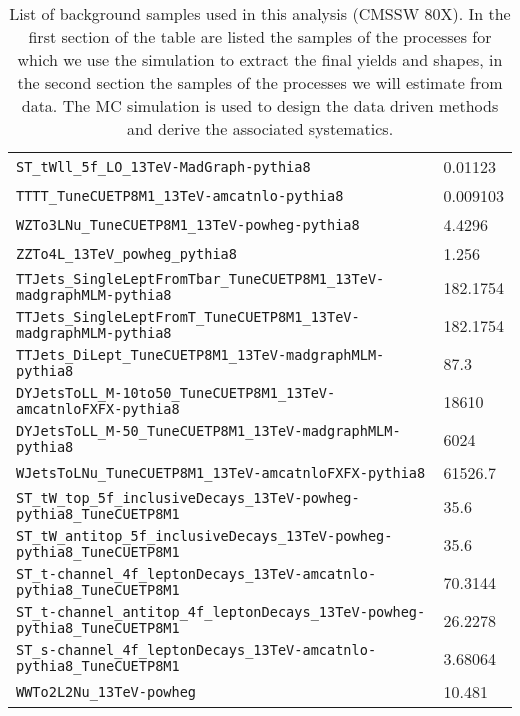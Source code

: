 \begin{table}
\begin{tabular}{ll}
\verb|ST_tWll_5f_LO_13TeV-MadGraph-pythia8|                                   & 0.01123 \\
\verb|TTTT_TuneCUETP8M1_13TeV-amcatnlo-pythia8|                               & 0.009103 \\
\verb|WZTo3LNu_TuneCUETP8M1_13TeV-powheg-pythia8|                             & 4.4296 \\
\verb|ZZTo4L_13TeV_powheg_pythia8|                                            & 1.256 \\ \hline
\verb|TTJets_SingleLeptFromTbar_TuneCUETP8M1_13TeV-madgraphMLM-pythia8|       & 182.1754 \\
\verb|TTJets_SingleLeptFromT_TuneCUETP8M1_13TeV-madgraphMLM-pythia8|          & 182.1754 \\
\verb|TTJets_DiLept_TuneCUETP8M1_13TeV-madgraphMLM-pythia8|                   & 87.3 \\
\verb|DYJetsToLL_M-10to50_TuneCUETP8M1_13TeV-amcatnloFXFX-pythia8|            & 18610 \\
\verb|DYJetsToLL_M-50_TuneCUETP8M1_13TeV-madgraphMLM-pythia8|                 & 6024 \\
\verb|WJetsToLNu_TuneCUETP8M1_13TeV-amcatnloFXFX-pythia8|                     & 61526.7 \\
\verb|ST_tW_top_5f_inclusiveDecays_13TeV-powheg-pythia8_TuneCUETP8M1|         & 35.6 \\
\verb|ST_tW_antitop_5f_inclusiveDecays_13TeV-powheg-pythia8_TuneCUETP8M1|     & 35.6 \\
\verb|ST_t-channel_4f_leptonDecays_13TeV-amcatnlo-pythia8_TuneCUETP8M1|       & 70.3144\\
\verb|ST_t-channel_antitop_4f_leptonDecays_13TeV-powheg-pythia8_TuneCUETP8M1| & 26.2278\\
\verb|ST_s-channel_4f_leptonDecays_13TeV-amcatnlo-pythia8_TuneCUETP8M1|       & 3.68064 \\
\verb|WWTo2L2Nu_13TeV-powheg|                                                 & 10.481 \\\hline
\end{tabular}
\caption[List of background samples used in this analysis (CMSSW 80X).]{List of background samples used in this analysis (CMSSW 80X). In the first section of the table are listed the samples of the processes for which we use the simulation to extract the final yields and shapes, in the second section the samples of the processes we will estimate from data. The MC simulation is used to design the data driven methods and derive the associated systematics.} \label{tab:bgsamples}
\end{table}

